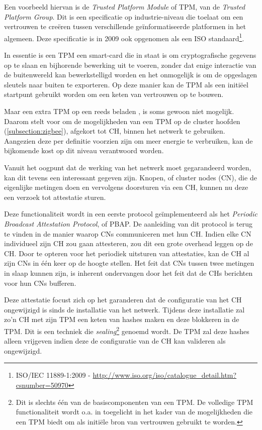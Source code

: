 Een voorbeeld hiervan is de \emph{Trusted Platform Module} of TPM, van de
\emph{Trusted Platform Group}. Dit is een specificatie op industrie-niveau die
toelaat om een vertrouwen te cre\"eren tussen verschillende ge\"informatiseerde
platformen in het algemeen. Deze specificatie is in 2009 ook opgenomen als een
ISO standaard\footnote{ISO/IEC 11889-1:2009 -
\url{http://www.iso.org/iso/catalogue_detail.htm?csnumber=50970}}.

In essentie is een TPM een smart-card die in staat is om cryptografische
gegevens op te slaan en bijhorende bewerking uit te voeren, zonder dat enige
interactie van de buitenwereld kan bewerkstelligd worden en het onmogelijk is
om de opgeslagen sleutels naar buiten te exporteren. Op deze manier kan de TPM
als een initi\"eel startpunt gebruikt worden om een keten van vertrouwen op te
bouwen.

Maar een extra TPM op een reeds beladen \mcu, is soms gewoon niet mogelijk.
Daarom stelt \citep{krauss2007detecting} voor om de mogelijkheden van een TPM op
de cluster hoofden (\ref{subsection:zigbee}), afgekort tot CH, binnen het
netwerk te gebruiken. Aangezien deze per definitie voorzien zijn om meer
energie te verbruiken, kan de bijkomende kost op dit niveau verantwoord worden.

Vanuit het oogpunt dat de werking van het netwerk moet gegarandeerd worden, kan
dit tevens een interessant gegeven zijn. Knopen, of cluster nodes (CN), die de
eigenlijke metingen doen en vervolgens doorsturen via een CH, kunnen nu deze
een verzoek tot attestatie sturen.

Deze functionaliteit wordt in een eerste protocol ge\"implementeerd als het
\emph{Periodic Broadcast Attestation Protocol}, of PBAP. De aanleiding van dit
protocol is terug te vinden in de manier waarop CNs communiceren met hun CH.
Indien elke CN individueel zijn CH zou gaan attesteren, zou dit een grote
overhead leggen op de CH. Door te opteren voor het periodiek uitsturen van
attestaties, kan de CH al zijn CNs in \'e\'en keer op de hoogte stellen. Het
feit dat CNs tussen twee metingen in slaap kunnen zijn, is inherent ondervangen
door het feit dat de CHs berichten voor hun CNs bufferen.

Deze attestatie focust zich op het garanderen dat de configuratie van het CH
ongewijzigd is sinds de installatie van het netwerk. Tijdens deze installatie
zal zo'n CH met zijn TPM een keten van hashes maken en deze blokkeren in de
TPM. Dit is een techniek die \emph{sealing}\footnote{Dit is slechts \'e\'en van
de basiscomponenten van een TPM. De volledige TPM functionaliteit wordt o.a. in
\citep{parno2010bootstrapping} toegelicht in het kader van de mogelijkheden die
een TPM biedt om als initi\"ele bron van vertrouwen gebruikt te worden.}
genoemd wordt. De TPM zal deze hashes alleen vrijgeven indien deze de
configuratie van de CH kan valideren als ongewijzigd.

